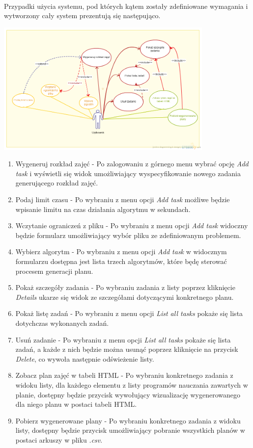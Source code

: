 \paragraph{}Przypadki użycia systemu, pod których kątem zostały zdefiniowane wymagania i wytworzony cały system prezentują się następująco.
\begin{center}
\includegraphics[width=0.8\textwidth]{img/InzynierkaUseCase.png}
\end{center}
\begin{enumerate}
\item{Wygeneruj rozkład zajęć} - Po zalogowaniu z górnego menu wybrać opcję \emph{Add task} i wyświetli się widok umożliwiający wyspecyfikowanie nowego zadania generującego rozkład zajęć.
\item{Podaj limit czasu} - Po wybraniu z menu opcji \emph{Add task} możliwe będzie wpisanie limitu na czas działania algorytmu w sekundach.
\item{Wczytanie ograniczeń z pliku} - Po wybraniu z menu opcji \emph{Add task} widoczny będzie formularz umożliwiający wybór pliku ze zdefiniowanym problemem.
\item{Wybierz algorytm} - Po wybraniu z menu opcji \emph{Add task} w widocznym formularzu dostępna jest lista trzech algorytmów, które będę sterować procesem generacji planu.
\item{Pokaż szczegóły zadania} - Po wybraniu zadania z listy poprzez kliknięcie \emph{Details} ukarze się widok ze szczegółami dotyczącymi konkretnego planu.
\item{Pokaż listę zadań} - Po wybraniu z menu opcji \emph{List all tasks} pokaże się lista dotychczas wykonanych zadań.
\item{Usuń zadanie} - Po wybraniu z menu opcji \emph{List all tasks} pokaże się lista zadań, a każde z nich będzie można usunąć poprzez kliknięcie na przycisk \emph{Delete}, co wywoła następnie odświeżenie listy.
\item{Zobacz plan zajęć w tabeli HTML} - Po wybraniu konkretnego zadania z widoku listy, dla każdego elementu z listy programów nauczania zawartych w planie, dostępny będzie przycisk wywołujący wizualizację wygenerowanego dla niego planu w postaci tabeli HTML.
\item{Pobierz wygenerowane plany} - Po wybraniu konkretnego zadania z widoku listy, dostępny będzie przycisk umożliwiający pobranie wszystkich planów w postaci arkuszy w pliku \emph{.csv}.
\end{enumerate}
